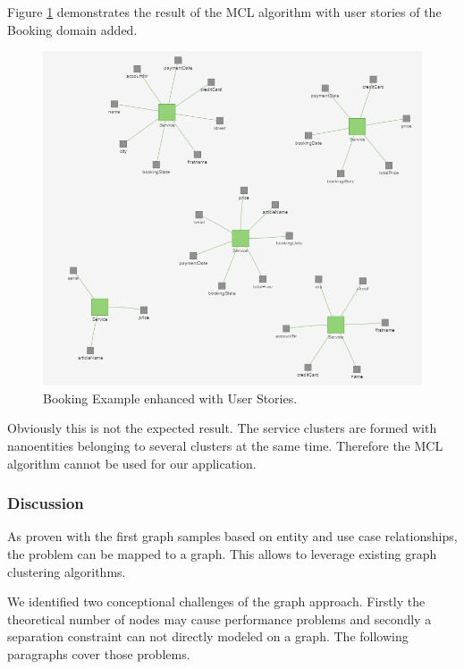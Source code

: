 Figure \ref{fig:clusteringBooking} demonstrates the result of the MCL algorithm with user stories of the Booking domain added. 

\begin{figure}[H]
	\begin{center}
		\includegraphics[scale=0.7]{images/booking_entities_mcl.png}
	\end{center}
	\caption{Booking Example enhanced with User Stories.}
	\label{fig:clusteringBooking}
\end{figure}

Obviously this is not the expected result. The service clusters are formed with nanoentities belonging to several clusters at the same time. Therefore the MCL algorithm cannot be used for our application.


\subsubsection{Discussion}

As proven with the first graph samples based on entity and use case relationships, the problem can be mapped to a graph. This allows to leverage existing graph clustering algorithms.

We identified two conceptional challenges of the graph approach. Firstly the theoretical number of nodes may cause performance problems and secondly a separation constraint can not directly modeled on a graph. The following paragraphs cover those problems.

